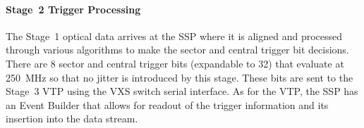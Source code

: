 \paragraph{Stage~2 Trigger Processing}
The Stage~1 optical data arrives at the SSP where it is aligned and processed through various algorithms to
make the sector and central trigger bit decisions. There are 8 sector and central trigger bits (expandable to
32) that evaluate at 250~MHz so that no jitter is introduced by this stage. These bits are sent to the Stage~3
VTP using the VXS switch serial interface. As for the VTP, the SSP has an Event Builder that allows for readout
of the trigger information and its insertion into the data stream.
